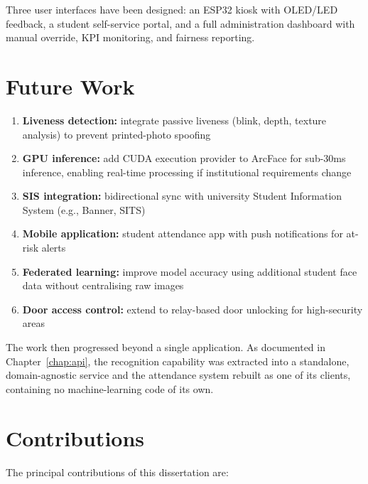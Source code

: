 \documentclass[12pt,a4paper]{report}
\begin{document}
Three user interfaces have been designed: an ESP32 kiosk with OLED/LED feedback, a student self-service portal, and a full administration dashboard with manual override, KPI monitoring, and fairness reporting.

\section{Future Work}
\begin{enumerate}
  \item \textbf{Liveness detection:} integrate passive liveness (blink, depth, texture analysis) to prevent printed-photo spoofing
  \item \textbf{GPU inference:} add CUDA execution provider to ArcFace for sub-30ms inference, enabling real-time processing if institutional requirements change
  \item \textbf{SIS integration:} bidirectional sync with university Student Information System (e.g., Banner, SITS)
  \item \textbf{Mobile application:} student attendance app with push notifications for at-risk alerts
  \item \textbf{Federated learning:} improve model accuracy using additional student face data without centralising raw images
  \item \textbf{Door access control:} extend to relay-based door unlocking for high-security areas
\end{enumerate}

The work then progressed beyond a single application. As documented in
Chapter~\ref{chap:api}, the recognition capability was extracted into a
standalone, domain-agnostic service and the attendance system rebuilt as one of
its clients, containing no machine-learning code of its own.

\section{Contributions}
The principal contributions of this dissertation are:
\end{document}
